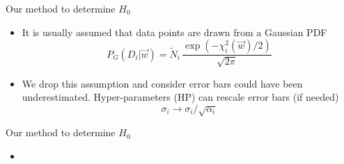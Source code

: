 \documentclass{beamer}
\begin{document}
\begin{frame}{Our method to determine $H_0$}

\begin{itemize}
\item It is usually assumed that data points are drawn from a Gaussian PDF
\begin{equation*}
P_G(D_i|\vec{w}) = \tilde{N}_i \, \frac{\exp(-\chi^2_i(\vec{w})/2)}{\sqrt{2\pi}}
\end{equation*}
\item We drop this assumption and consider error bars could have been underestimated. Hyper-parameters (HP) can rescale error bars (if needed) 
\begin{equation*}
\sigma_i \rightarrow \sigma_i/\sqrt{\alpha_i}
\end{equation*}
\end{itemize}
\end{frame}

\begin{frame}{Our method to determine $H_0$}
\begin{itemize}
\item[]
\end{itemize}
\end{frame}
\end{document}
